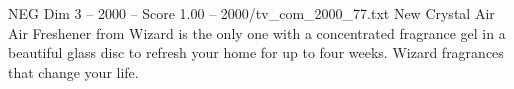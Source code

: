 \begin{textsample}{NEG Dim 3 – 2000 – Score 1.00 – 2000/tv\_com\_2000\_77.txt}  \label{ex:f3_neg_010}
New Crystal Air Air Freshener from Wizard is the only one with a concentrated fragrance gel in a beautiful glass disc to refresh your home for up to four weeks.
Wizard fragrances that change your life.

\end{textsample}

